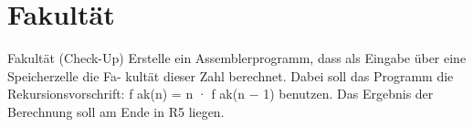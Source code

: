 \documentclass{lehramt-informatik-aufgabe}
\begin{document}
\section{Fakultät}

Fakultät (Check-Up)
Erstelle ein Assemblerprogramm, dass als Eingabe über eine Speicherzelle die Fa-
kultät dieser Zahl berechnet. Dabei soll das Programm die Rekursionsvorschrift:
f ak(n) = n · f ak(n − 1)
benutzen.
Das Ergebnis der Berechnung soll am Ende in R5 liegen.
\end{document}

